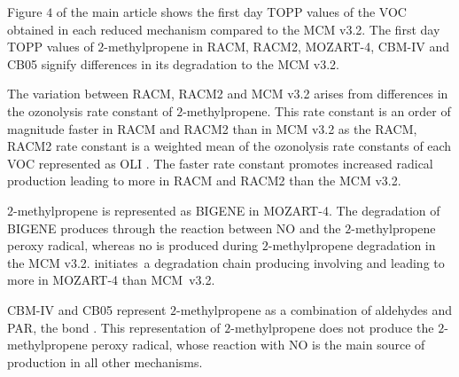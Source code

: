 %
Figure $4$ of the main article shows the first day TOPP values of the VOC obtained in each reduced mechanism compared to the MCM v3.2.
The first day TOPP values of $2$-methylpropene in RACM, RACM2, MOZART-4, CBM-IV and CB05 signify differences in its degradation to the MCM v3.2.

The variation between RACM, RACM2 and MCM v3.2 arises from differences in the ozonolysis rate constant of $2$-methylpropene.
This rate constant is an order of magnitude faster in RACM and RACM2 than in MCM v3.2 as the RACM, RACM2 rate constant is a weighted mean of the ozonolysis rate constants of each VOC represented as OLI \citep{Stockwell:1997, Goliff:2013}.
The faster rate constant promotes increased radical production leading to more  in RACM and RACM2 than the MCM v3.2.

$2$-methylpropene is represented as BIGENE in MOZART-4. 
The degradation of BIGENE produces  through the reaction between NO and the $2$-methylpropene peroxy radical, whereas no  is produced during $2$-methylpropene degradation in the MCM v3.2.
 \mbox{initiates a} degradation chain producing  involving  and  leading to more  in MOZART-4 than \mbox{MCM v3.2}.

CBM-IV and CB05 represent $2$-methylpropene as a combination of aldehydes and PAR, the  bond \citep{Gery:1989, Yarwood:2005}.
This representation of $2$-methylpropene does not produce the $2$-methylpropene peroxy radical, whose reaction with NO is the main source of  production in all other mechanisms.

